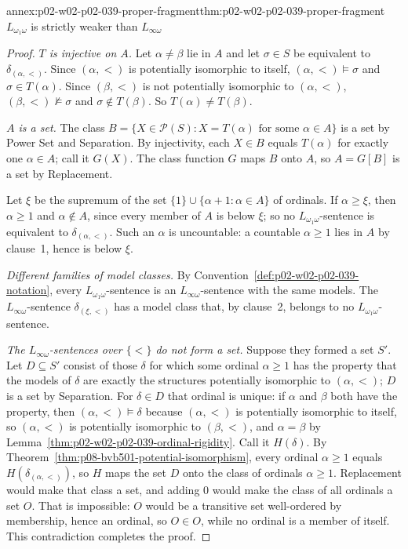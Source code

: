 \begin{annexitem}{annex:p02-w02-p02-039-proper-fragment}{thm:p02-w02-p02-039-proper-fragment}{\(L_{\omega_1\omega}\) is strictly weaker than \(L_{\infty\omega}\)}
\begin{proof}
\emph{\(T\) is injective on \(A\).}  Let \(\alpha\neq\beta\) lie in \(A\)
and let \(\sigma\in S\) be equivalent to \(\delta_{(\alpha,<)}\).  Since
\((\alpha,<)\) is potentially isomorphic to itself, \((\alpha,<)\models
\sigma\) and \(\sigma\in T(\alpha)\).  Since \((\beta,<)\) is not
potentially isomorphic to \((\alpha,<)\), \((\beta,<)\not\models\sigma\)
and \(\sigma\notin T(\beta)\).  So \(T(\alpha)\neq T(\beta)\).

\emph{\(A\) is a set.}  The class
\(B=\{X\in\mathcal P(S):X=T(\alpha)\text{ for some }\alpha\in A\}\) is a
set by Power Set and Separation.  By injectivity, each \(X\in B\) equals
\(T(\alpha)\) for exactly one \(\alpha\in A\); call it \(G(X)\).  The
class function \(G\) maps \(B\) onto \(A\), so \(A=G[B]\) is a set by
Replacement.

Let \(\xi\) be the supremum of the set \(\{1\}\cup\{\alpha+1:\alpha\in A\}\)
of ordinals.  If \(\alpha\geq\xi\), then \(\alpha\geq1\) and
\(\alpha\notin A\), since every member of \(A\) is below \(\xi\); so no
\(L_{\omega_1\omega}\)-sentence is equivalent to \(\delta_{(\alpha,<)}\).
Such an \(\alpha\) is uncountable: a countable \(\alpha\geq1\) lies in
\(A\) by clause~1, hence is below \(\xi\).

\emph{Different families of model classes.}  By Convention~\ref{def:p02-w02-p02-039-notation},
every \(L_{\omega_1\omega}\)-sentence is an \(L_{\infty\omega}\)-sentence
with the same models.  The \(L_{\infty\omega}\)-sentence
\(\delta_{(\xi,<)}\) has a model class that, by clause~2, belongs to no
\(L_{\omega_1\omega}\)-sentence.

\emph{The \(L_{\infty\omega}\)-sentences over \(\{<\}\) do not form a set.}
Suppose they formed a set \(S'\).  Let \(D\subseteq S'\) consist of those
\(\delta\) for which some ordinal \(\alpha\geq1\) has the property that the
models of \(\delta\) are exactly the structures potentially isomorphic to
\((\alpha,<)\); \(D\) is a set by Separation.  For \(\delta\in D\) that
ordinal is unique: if \(\alpha\) and \(\beta\) both have the property, then
\((\alpha,<)\models\delta\) because \((\alpha,<)\) is potentially
isomorphic to itself, so \((\alpha,<)\) is potentially isomorphic to
\((\beta,<)\), and \(\alpha=\beta\) by
Lemma~\ref{thm:p02-w02-p02-039-ordinal-rigidity}.  Call it \(H(\delta)\).
By Theorem~\ref{thm:p08-bvb501-potential-isomorphism}, every ordinal
\(\alpha\geq1\) equals \(H(\delta_{(\alpha,<)})\), so \(H\) maps the set
\(D\) onto the class of ordinals \(\alpha\geq1\).  Replacement would make
that class a set, and adding \(0\) would make the class of all ordinals a
set \(O\).  That is impossible: \(O\) would be a transitive set well-ordered
by membership, hence an ordinal, so \(O\in O\), while no ordinal is a member
of itself.  This contradiction completes the proof.
\end{proof}
\end{annexitem}
